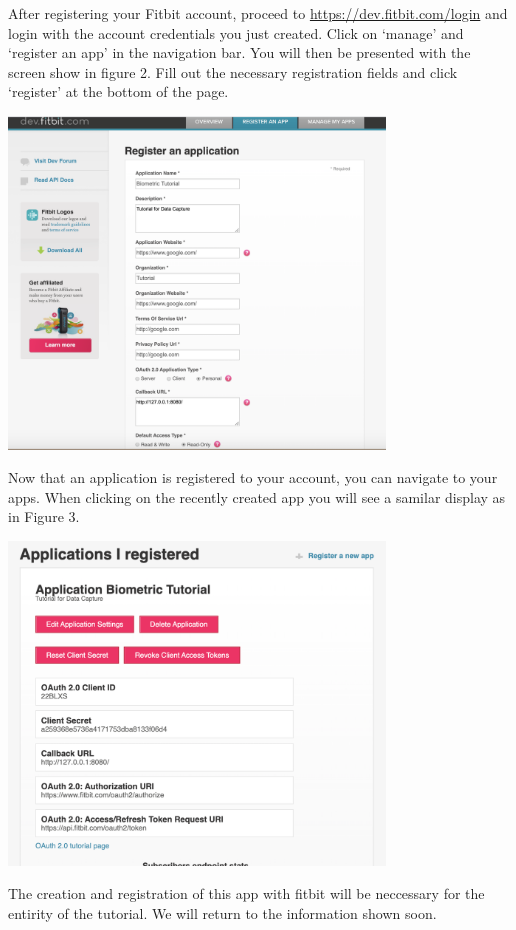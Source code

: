 \documentclass[]{book}
\begin{document}
After registering your Fitbit account, proceed to
\url{https://dev.fitbit.com/login} and login with the account
credentials you just created. Click on `manage' and `register an app' in
the navigation bar. You will then be presented with the screen show in
figure 2. Fill out the necessary registration fields and click
`register' at the bottom of the page.

\includegraphics[width=0.75000\textwidth]{images/registerApp.png}

Now that an application is registered to your account, you can navigate
to your apps. When clicking on the recently created app you will see a
samilar display as in Figure 3.

\includegraphics[width=0.75000\textwidth]{images/appDetails.png}

The creation and registration of this app with fitbit will be neccessary
for the entirity of the tutorial. We will return to the information
shown soon.
\end{document}

